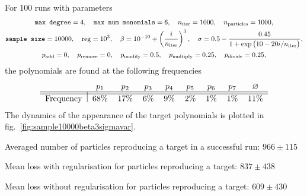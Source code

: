 \documentclass[11pt]{article}
\begin{document}
\begin{enumerate}
	  For 100 runs with parameters
		\begin{equation} \label{eq:sample10000beta3sigmavar}
			\begin{gathered}
				\texttt{max degree} = 4, \quad \texttt{max num monomials} = 6, \quad n_{\rm iter} = 1000, \quad n_{\rm particles} = 1000, \\
				\texttt{sample size} = 10000, \quad {\rm reg} = 10^{3}, \quad \beta = 10^{-10} + \left(\frac{i}{n_{\rm iter}}\right)^{3}, \quad \sigma = 0.5 - \frac{0.45}{1+\exp\big(10-20 i/n_{\rm iter}\big)}, \\
				p_{\rm add} = 0, \quad p_{\rm remove} = 0, \quad p_{\rm modify} = 0.5, \quad p_{\rm multiply} = 0.25, \quad p_{\rm divide} = 0.25,
			\end{gathered}
		\end{equation}
		the polynomials are found at the following frequencies
	  \begin{equation}
	  	\begin{tabular}{l|cccccccc}
	  		& $p_{1}$ & $p_{2}$ & $p_{3}$ & $p_{4}$ & $p_{5}$ & $p_{6}$ & $p_{7}$ & $\varnothing$ \\\hline\hline
	  		Frequency & 68\% & 17\% & 6\% & 9\% & 2\% & 1\% & 1\% & 11\%
	  	\end{tabular}
	  \end{equation}
	  The dynamics of the appearance of the target polynomials is plotted in fig.~\ref{fig:sample10000beta3sigmavar}.

	  Averaged number of particles reproducing a target in a successful run: $966 \pm 115$

	  Mean loss with regularisation for particles reproducing a target: $837 \pm 438$

	  Mean loss without regularisation for particles reproducing a target: $609 \pm 430$


\end{enumerate}
\end{document}
